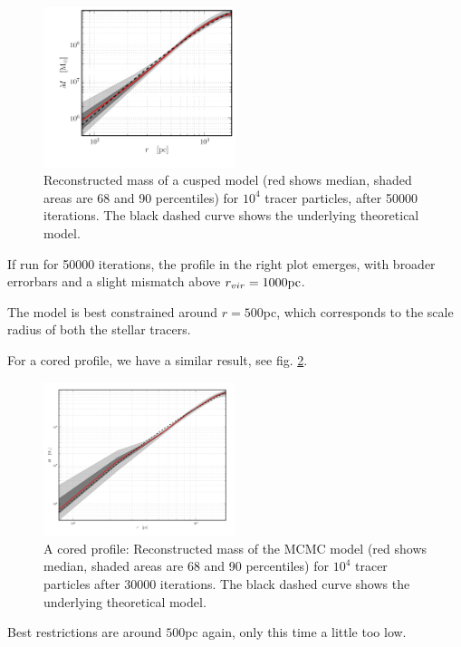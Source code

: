 \begin{figure}
\begin{center}
\hspace{-7mm}
\includegraphics[width=0.5\textwidth]{fig/recent_50k.pdf}
\caption{Reconstructed mass of a cusped model (red shows median,
  shaded areas are 68 and 90 percentiles) for $10^4$ tracer particles,
  after 50000 iterations. The black dashed curve shows the underlying
  theoretical model.}
\label{fig:cusp}
\end{center}
\end{figure}

If run for 50000 iterations, the profile in the right plot emerges,
with broader errorbars and a slight mismatch above $r_{vir}=1000{\rm
  pc}$.

The model is best constrained around $r=500$pc, which corresponds to
the scale radius of both the stellar tracers.

For a cored profile, we have a similar result, see fig. \ref{fig:core}.

\begin{figure}
\begin{center}
\hspace{-7mm}
\includegraphics[width=0.5\textwidth]{fig/core_30k.pdf}
\caption{A cored profile: Reconstructed mass of the MCMC model (red
  shows median, shaded areas are 68 and 90 percentiles) for $10^4$
  tracer particles after 30000 iterations. The black dashed curve
  shows the underlying theoretical model.}
\label{fig:core}
\end{center}
\end{figure}

Best restrictions are around $500$pc again, only this time a little
too low.
